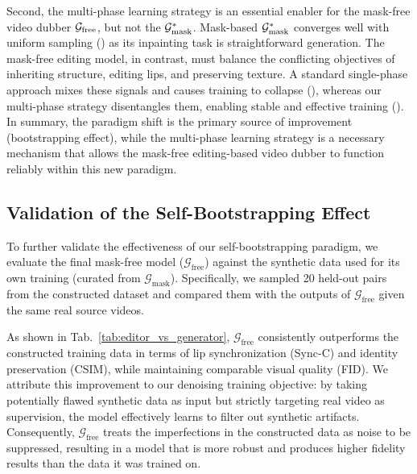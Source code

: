 Second, the multi-phase learning strategy is an essential enabler for the mask-free video dubber $\mathcal{G}_{\text{free}}$, but not the $\mathcal{G}_{\text{mask}}^*$. Mask-based $\mathcal{G}_{\text{mask}}^*$ converges well with uniform sampling (\textbf{}) as its inpainting task is straightforward generation. The mask-free editing model, in contrast, must balance the conflicting objectives of inheriting structure, editing lips, and preserving texture. A standard single-phase approach mixes these signals and causes training to collapse (\textbf{}), whereas our multi-phase strategy disentangles them, enabling stable and effective training (\textbf{}). In summary, the paradigm shift is the primary source of improvement (bootstrapping effect), while the multi-phase learning strategy is a necessary mechanism that allows the mask-free editing-based video dubber to function reliably within this new paradigm.

\subsection{Validation of the Self-Bootstrapping Effect}
To further validate the effectiveness of our self-bootstrapping paradigm, we evaluate the final mask-free model ($\mathcal{G}_{\text{free}}$) against the synthetic data used for its own training (curated from $\mathcal{G}_{\text{mask}}$). Specifically, we sampled 20 held-out pairs from the constructed dataset and compared them with the outputs of $\mathcal{G}_{\text{free}}$ given the same real source videos.

As shown in Tab.~\ref{tab:editor_vs_generator}, $\mathcal{G}_{\text{free}}$ consistently outperforms the constructed training data in terms of lip synchronization (Sync-C) and identity preservation (CSIM), while maintaining comparable visual quality (FID).
We attribute this improvement to our denoising training objective: by taking potentially flawed synthetic data as input but strictly targeting real video as supervision, the model effectively learns to filter out synthetic artifacts. Consequently, $\mathcal{G}_{\text{free}}$ treats the imperfections in the constructed data as noise to be suppressed, resulting in a model that is more robust and produces higher fidelity results than the data it was trained on.


